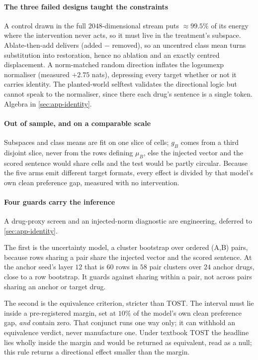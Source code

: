 \paragraph{The three failed designs taught the constraints} A control drawn in
the full $2048$-dimensional stream puts $\approx 99.5\%$ of its energy where the
intervention never acts, so it must live in the treatment's subspace.
Ablate-then-add delivers (added $-$ removed), so an uncentred class mean turns
substitution into restoration, hence no ablation and an exactly centred
displacement. A norm-matched random direction inflates the logsumexp normaliser
(measured $+2.75$ nats), depressing every target whether or not it carries
identity. The planted-world selftest validates the directional logic but cannot
speak to the normaliser, since there each drug's sentence is a single token.
Algebra in \cref{sec:app-identity}.

\paragraph{Out of sample, and on a comparable scale} Subspaces and class means are
fit on one slice of cells; $g_B$ comes from a third disjoint slice, never from
the rows defining $\mu_B$, else the injected vector and the scored sentence would
share cells and the test would be partly circular. Because the five arms emit
different target formats, every effect is divided by that model's own clean
preference gap, measured with no intervention.

\paragraph{Four guards carry the inference} A drug-proxy screen and an
injected-norm diagnostic are engineering, deferred to \cref{sec:app-identity}.

The first is the uncertainty model, a cluster bootstrap over ordered (A,B) pairs,
because rows sharing a pair share the injected vector and the scored sentence. At
the anchor seed's layer $12$ that is $60$ rows in $58$ pair clusters over $24$
anchor drugs, close to a row bootstrap. It guards against sharing within a pair,
not across pairs sharing an anchor or target drug.

The second is the equivalence criterion, stricter than TOST. The interval must
lie inside a pre-registered margin, set at $10\%$ of the model's own clean
preference gap, \emph{and} contain zero. That conjunct runs one way only; it can
withhold an equivalence verdict, never manufacture one. Under textbook TOST the
headline  lies wholly inside the margin and would
be returned as equivalent, read as a null; this rule returns a directional effect
smaller than the margin.

